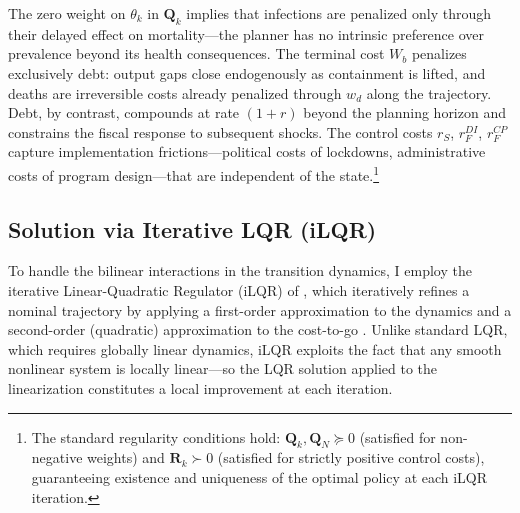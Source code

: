 The zero weight on $\theta_k$ in $\bm{Q}_k$ implies that infections are penalized
only through their delayed effect on mortality---the planner has no intrinsic
preference over prevalence beyond its health consequences. The terminal cost $W_b$
penalizes exclusively debt: output gaps close endogenously as containment is lifted,
and deaths are irreversible costs already penalized through $w_d$ along the trajectory.
Debt, by contrast, compounds at rate $(1+r)$ beyond the planning horizon and constrains
the fiscal response to subsequent shocks. The control costs $r_S$, $r_F^{DI}$,
$r_F^{CP}$ capture implementation frictions---political costs of lockdowns,
administrative costs of program design---that are independent of the
state.\footnote{The standard regularity conditions hold: $\bm{Q}_k, \bm{Q}_N \succeq
0$ (satisfied for non-negative weights) and $\bm{R}_k \succ 0$ (satisfied for strictly
positive control costs), guaranteeing existence and uniqueness of the optimal policy at each iLQR iteration.}


\subsection{Solution via Iterative LQR (iLQR)}
\label{sec:ilqr}

To handle the bilinear interactions in the transition dynamics, I employ the
iterative Linear-Quadratic Regulator (iLQR) of \citet{li2004iterative}, which
iteratively refines a nominal trajectory by applying a first-order approximation to
the dynamics and a second-order (quadratic) approximation to the cost-to-go
\citep{tassa2014control}. Unlike standard LQR, which requires globally linear
dynamics, iLQR exploits the fact that any smooth nonlinear system is locally
linear—so the LQR solution applied to the linearization constitutes a local
improvement at each iteration.


